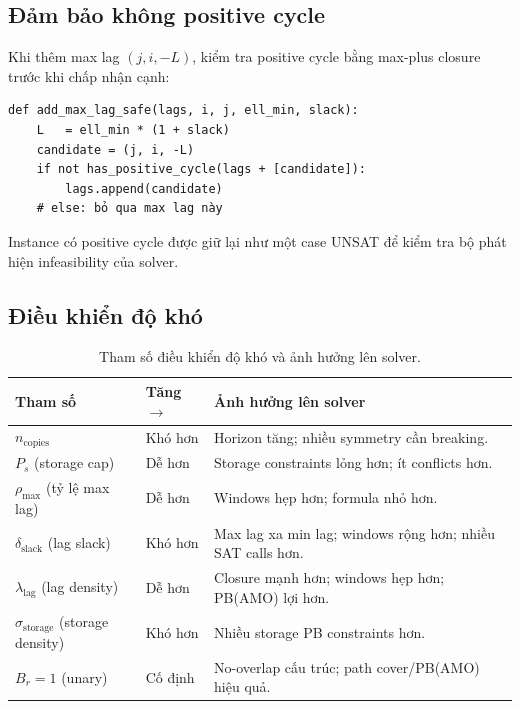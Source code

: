 \documentclass[11pt,a4paper]{article}
\theoremstyle{remark}
\begin{document}
\subsection{Đảm bảo không positive cycle}

Khi thêm max lag $(j, i, -L)$, kiểm tra positive cycle bằng max-plus closure
trước khi chấp nhận cạnh:

\begin{verbatim}
def add_max_lag_safe(lags, i, j, ell_min, slack):
    L   = ell_min * (1 + slack)
    candidate = (j, i, -L)
    if not has_positive_cycle(lags + [candidate]):
        lags.append(candidate)
    # else: bỏ qua max lag này
\end{verbatim}

Instance có positive cycle được giữ lại như một case UNSAT để kiểm tra
bộ phát hiện infeasibility của solver.

\subsection{Điều khiển độ khó}

\begin{table}[htbp]
\centering
\caption{Tham số điều khiển độ khó và ảnh hưởng lên solver.}
\label{tab:difficulty}
\begin{tabularx}{\textwidth}{@{}p{}p{}Y@{}}
\toprule
\textbf{Tham số} & \textbf{Tăng $\to$} & \textbf{Ảnh hưởng lên solver}\\
\midrule
$n_\mathrm{copies}$ & Khó hơn &
  Horizon tăng; nhiều symmetry cần breaking.\\
$P_s$ (storage cap) & Dễ hơn &
  Storage constraints lỏng hơn; ít conflicts hơn.\\
$\rho_\mathrm{max}$ (tỷ lệ max lag) & Dễ hơn &
  Windows hẹp hơn; formula nhỏ hơn.\\
$\delta_\mathrm{slack}$ (lag slack) & Khó hơn &
  Max lag xa min lag; windows rộng hơn; nhiều SAT calls hơn.\\
$\lambda_\mathrm{lag}$ (lag density) & Dễ hơn &
  Closure mạnh hơn; windows hẹp hơn; PB(AMO) lợi hơn.\\
$\sigma_\mathrm{storage}$ (storage density) & Khó hơn &
  Nhiều storage PB constraints hơn.\\
$B_r = 1$ (unary) & Cố định &
  No-overlap cấu trúc; path cover/PB(AMO) hiệu quả.\\
\bottomrule
\end{tabularx}
\end{table}
\end{document}
